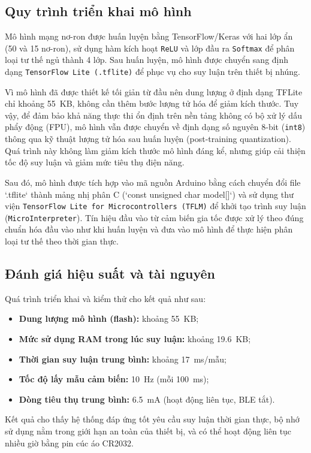 \subsection{Quy trình triển khai mô hình}

Mô hình mạng nơ-ron được huấn luyện bằng TensorFlow/Keras với hai lớp ẩn (50 và 15 nơ-ron), sử dụng hàm kích hoạt \texttt{ReLU} và lớp đầu ra \texttt{Softmax} để phân loại tư thế ngủ thành 4 lớp. Sau huấn luyện, mô hình được chuyển sang định dạng \texttt{TensorFlow Lite (.tflite)} để phục vụ cho suy luận trên thiết bị nhúng.

Vì mô hình đã được thiết kế tối giản từ đầu nên dung lượng ở định dạng TFLite chỉ khoảng 55~KB, không cần thêm bước lượng tử hóa để giảm kích thước. Tuy vậy, để đảm bảo khả năng thực thi ổn định trên nền tảng không có bộ xử lý dấu phẩy động (FPU), mô hình vẫn được chuyển về định dạng số nguyên 8-bit (\texttt{int8}) thông qua kỹ thuật lượng tử hóa sau huấn luyện (post-training quantization). Quá trình này không làm giảm kích thước mô hình đáng kể, nhưng giúp cải thiện tốc độ suy luận và giảm mức tiêu thụ điện năng.

Sau đó, mô hình được tích hợp vào mã nguồn Arduino bằng cách chuyển đổi file `.tflite` thành mảng nhị phân C (`const unsigned char model[]`) và sử dụng thư viện \texttt{TensorFlow Lite for Microcontrollers (TFLM)} để khởi tạo trình suy luận (\texttt{MicroInterpreter}). Tín hiệu đầu vào từ cảm biến gia tốc được xử lý theo đúng chuẩn hóa đầu vào như khi huấn luyện và đưa vào mô hình để thực hiện phân loại tư thế theo thời gian thực.

\subsection{Đánh giá hiệu suất và tài nguyên}

Quá trình triển khai và kiểm thử cho kết quả như sau:

\begin{itemize}
    \item \textbf{Dung lượng mô hình (flash):} khoảng 55~KB;
    \item \textbf{Mức sử dụng RAM trong lúc suy luận:} khoảng 19.6~KB;
    \item \textbf{Thời gian suy luận trung bình:} khoảng 17~ms/mẫu;
    \item \textbf{Tốc độ lấy mẫu cảm biến:} 10~Hz (mỗi 100~ms);
    \item \textbf{Dòng tiêu thụ trung bình:} 6.5~mA (hoạt động liên tục, BLE tắt).
\end{itemize}

Kết quả cho thấy hệ thống đáp ứng tốt yêu cầu suy luận thời gian thực, bộ nhớ sử dụng nằm trong giới hạn an toàn của thiết bị, và có thể hoạt động liên tục nhiều giờ bằng pin cúc áo CR2032.



